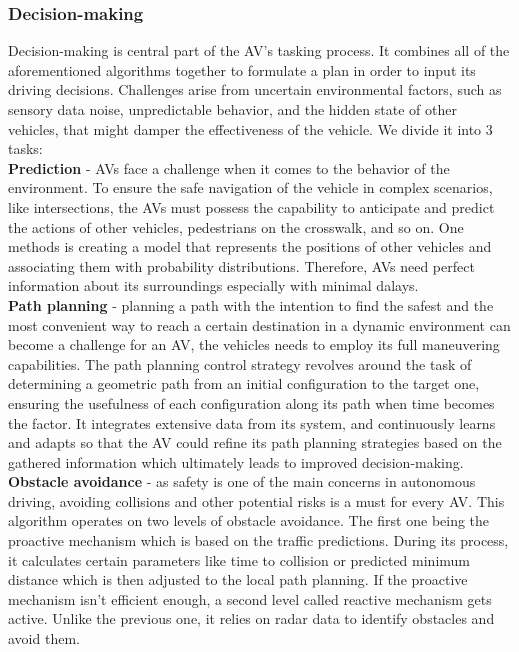 \documentclass[10pt,oneside,english,a4paper]{article}
\begin{document}
\subsubsection{Decision-making}
\indent Decision-making is central part of the AV's tasking process. It combines all of the aforementioned algorithms together to formulate a plan in order to input its driving decisions. Challenges arise from uncertain environmental factors, such as sensory data noise, unpredictable behavior, and the hidden state of other vehicles, that might damper the effectiveness of the vehicle. We divide it into 3 tasks:\\
\indent \textbf{Prediction} - AVs face a challenge when it comes to the behavior of the environment. To ensure the safe navigation of the vehicle in complex scenarios, like intersections, the AVs must possess the capability to anticipate and predict the actions of other vehicles, pedestrians on the crosswalk, and so on. One methods is creating a model that represents the positions of other vehicles and associating them with probability distributions. Therefore, AVs need perfect information about its surroundings especially with minimal dalays.\\
\indent \textbf{Path planning} - planning a path with the intention to find the safest and the most convenient way to reach a certain destination in a dynamic environment can become a challenge for an AV, the vehicles needs to employ its full maneuvering capabilities. The path planning control strategy revolves around the task of determining a geometric path from an initial configuration to the target one, ensuring the usefulness of each configuration along its path when time becomes the factor. It integrates extensive data from its system, and continuously learns and adapts so that the AV could refine its path planning strategies based on the gathered information which ultimately leads to improved decision-making.\\
\indent \textbf{Obstacle avoidance} - as safety is one of the main concerns in autonomous driving, avoiding collisions and other potential risks is a must for every AV. This algorithm operates on two levels of obstacle avoidance. The first one being the proactive mechanism which is based on the traffic predictions. During its process, it calculates certain parameters like time to collision or predicted minimum distance which is then adjusted to the local path planning. If the proactive mechanism isn't efficient enough, a second level called reactive mechanism gets active. Unlike the previous one, it relies on radar data to identify obstacles and avoid them. 
\cite{computerarch}\cite{AIandIoT}\cite{approach}
\end{document}
